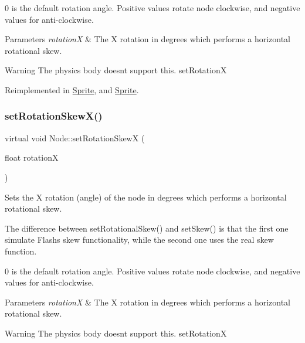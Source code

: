 0 is the default rotation angle. Positive values rotate node clockwise, and negative values for anti-\/clockwise.


\begin{DoxyParams}{Parameters}
{\em rotationX} & The X rotation in degrees which performs a horizontal rotational skew.\\
\hline
\end{DoxyParams}
\begin{DoxyWarning}{Warning}
The physics body doesn\textquotesingle{}t support this.  set\+RotationX 
\end{DoxyWarning}


Reimplemented in \hyperlink{classSprite_adcc286e6eb86f3fd6242de9cdf321301}{Sprite}, and \hyperlink{classSprite_a8fe7bd093a18a2245c230b96f2c59897}{Sprite}.

\mbox{\label{classNode_a63c7e9e926cf94379b437a41eba0b111}} 
\subsubsection{\texorpdfstring{set\+Rotation\+Skew\+X()}{setRotationSkewX()}\hspace{0.1cm}{\footnotesize\ttfamily [2/2]}}
{\footnotesize\ttfamily virtual void Node\+::set\+Rotation\+SkewX (\begin{DoxyParamCaption}\item[{float}]{rotationX }\end{DoxyParamCaption})\hspace{0.3cm}{\ttfamily [virtual]}}

Sets the X rotation (angle) of the node in degrees which performs a horizontal rotational skew.

The difference between {\ttfamily set\+Rotational\+Skew()} and {\ttfamily set\+Skew()} is that the first one simulate Flash\textquotesingle{}s skew functionality, while the second one uses the real skew function.

0 is the default rotation angle. Positive values rotate node clockwise, and negative values for anti-\/clockwise.


\begin{DoxyParams}{Parameters}
{\em rotationX} & The X rotation in degrees which performs a horizontal rotational skew.\\
\hline
\end{DoxyParams}
\begin{DoxyWarning}{Warning}
The physics body doesn\textquotesingle{}t support this.  set\+RotationX 
\end{DoxyWarning}


